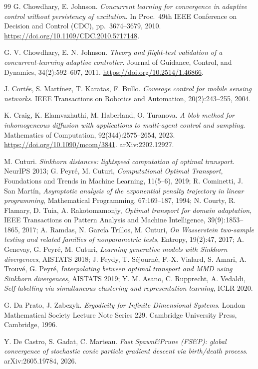 \begin{thebibliography}{99}
G. Chowdhary, E. Johnson.
\emph{Concurrent learning for convergence in adaptive control without persistency of excitation}.
In Proc.\ 49th IEEE Conference on Decision and Control (CDC), pp.~3674--3679, 2010.
\url{https://doi.org/10.1109/CDC.2010.5717148}.

G. V. Chowdhary, E. N. Johnson.
\emph{Theory and flight-test validation of a concurrent-learning adaptive controller}.
Journal of Guidance, Control, and Dynamics, 34(2):592--607, 2011.
\url{https://doi.org/10.2514/1.46866}.

J. Cort\'es, S. Mart\'inez, T. Karatas, F. Bullo.
\emph{Coverage control for mobile sensing networks}.
IEEE Transactions on Robotics and Automation, 20(2):243--255, 2004.

K. Craig, K. Elamvazhuthi, M. Haberland, O. Turanova.
\emph{A blob method for inhomogeneous diffusion with applications to multi-agent control and sampling}.
Mathematics of Computation, 92(344):2575--2654, 2023.
\url{https://doi.org/10.1090/mcom/3841}.
arXiv:2202.12927.

M. Cuturi.
\emph{Sinkhorn distances: lightspeed computation of optimal transport}.
NeurIPS 2013;
G. Peyr\'e, M. Cuturi, \emph{Computational Optimal Transport}, Foundations and Trends in Machine Learning,
11(5--6), 2019;
R. Cominetti, J. San Mart\'in, \emph{Asymptotic analysis of the exponential penalty trajectory in linear
programming}, Mathematical Programming, 67:169--187, 1994;
N. Courty, R. Flamary, D. Tuia, A. Rakotomamonjy, \emph{Optimal transport for domain adaptation}, IEEE Transactions
on Pattern Analysis and Machine Intelligence, 39(9):1853--1865, 2017;
A. Ramdas, N. Garc\'ia Trillos, M. Cuturi, \emph{On Wasserstein two-sample testing and related families of
nonparametric tests}, Entropy, 19(2):47, 2017;
A. Genevay, G. Peyr\'e, M. Cuturi, \emph{Learning generative models with Sinkhorn divergences}, AISTATS 2018;
J. Feydy, T. S\'ejourn\'e, F.-X. Vialard, S. Amari, A. Trouv\'e, G. Peyr\'e, \emph{Interpolating between optimal
transport and MMD using Sinkhorn divergences}, AISTATS 2019;
Y. M. Asano, C. Rupprecht, A. Vedaldi, \emph{Self-labelling via simultaneous clustering and representation
learning}, ICLR 2020.

G. Da Prato, J. Zabczyk.
\emph{Ergodicity for Infinite Dimensional Systems}.
London Mathematical Society Lecture Note Series 229. Cambridge University Press, Cambridge, 1996.

Y. De Castro, S. Gadat, C. Marteau.
\emph{Fast Spawn\&Prune (FS\&P): global convergence of stochastic conic particle gradient descent via
birth/death process}.
arXiv:2605.19784, 2026.


\end{thebibliography}
